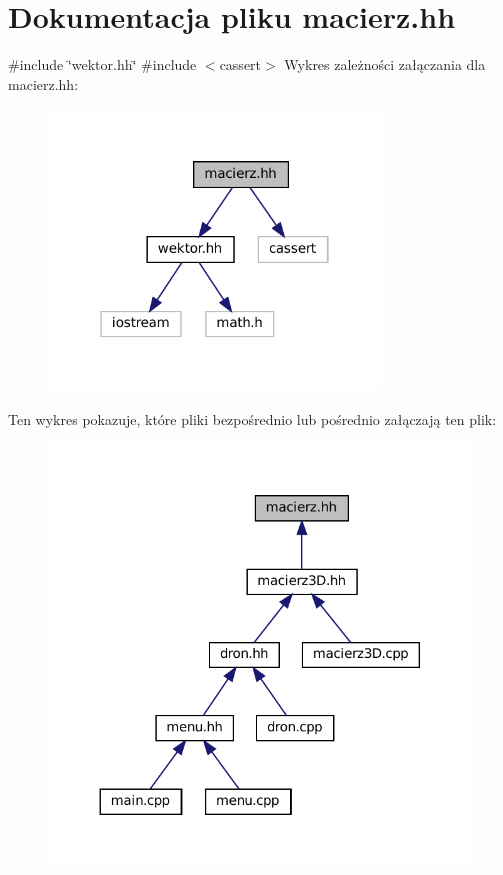 \hypertarget{macierz_8hh}{}\section{Dokumentacja pliku macierz.\+hh}
\label{macierz_8hh}
{\ttfamily \#include \char`\"{}wektor.\+hh\char`\"{}}\newline
{\ttfamily \#include $<$cassert$>$}\newline
Wykres zależności załączania dla macierz.\+hh\+:\nopagebreak
\begin{figure}[H]
\begin{center}
\leavevmode
\includegraphics[width=250pt]{macierz_8hh__incl}
\end{center}
\end{figure}
Ten wykres pokazuje, które pliki bezpośrednio lub pośrednio załączają ten plik\+:\nopagebreak
\begin{figure}[H]
\begin{center}
\leavevmode
\includegraphics[width=324pt]{macierz_8hh__dep__incl}
\end{center}
\end{figure}
